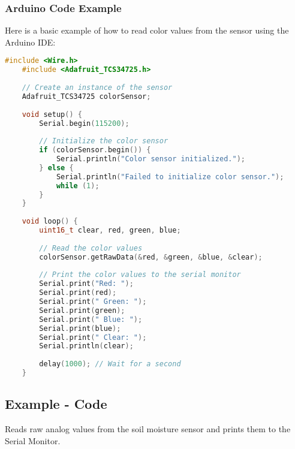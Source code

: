 \subsubsection{Arduino Code Example}

Here is a basic example of how to read color values from the sensor using the Arduino IDE:

\begin{lstlisting}[language=C++, caption=Arduino Code for Color Sensor with ESP32]
	#include <Wire.h>
	#include <Adafruit_TCS34725.h>
	
	// Create an instance of the sensor
	Adafruit_TCS34725 colorSensor;
	
	void setup() {
		Serial.begin(115200);
		
		// Initialize the color sensor
		if (colorSensor.begin()) {
			Serial.println("Color sensor initialized.");
		} else {
			Serial.println("Failed to initialize color sensor.");
			while (1);
		}
	}
	
	void loop() {
		uint16_t clear, red, green, blue;
		
		// Read the color values
		colorSensor.getRawData(&red, &green, &blue, &clear);
		
		// Print the color values to the serial monitor
		Serial.print("Red: ");
		Serial.print(red);
		Serial.print(" Green: ");
		Serial.print(green);
		Serial.print(" Blue: ");
		Serial.print(blue);
		Serial.print(" Clear: ");
		Serial.println(clear);
		
		delay(1000); // Wait for a second
	}
\end{lstlisting}



\subsection{Example - Code}
Reads raw analog values from the soil moisture sensor and prints them to the Serial Monitor.



